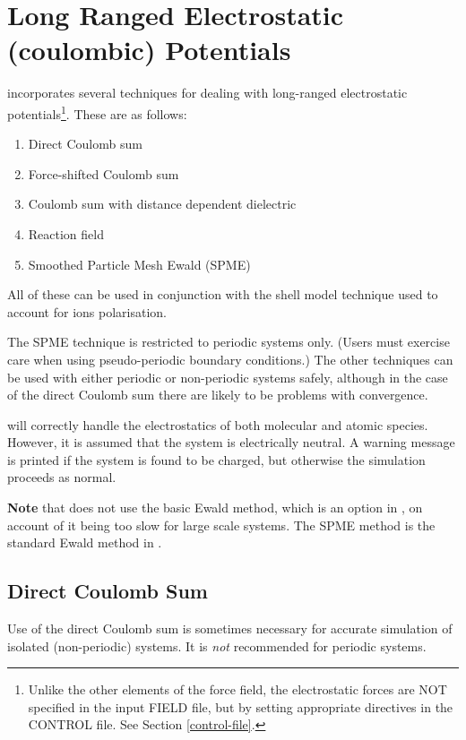 \section{Long Ranged Electrostatic (coulombic) Potentials}
\label{coulomb}

\D incorporates several techniques for dealing with long-ranged
electrostatic potentials\footnote{Unlike the
other elements of the force field, the electrostatic forces are
NOT specified in the input FIELD file, but by setting appropriate
directives in the CONTROL file. See Section \ref{control-file}.}.
These are as follows:
\begin{enumerate}
\item Direct Coulomb sum
\item Force-shifted Coulomb sum
\item Coulomb sum with distance dependent dielectric
\item Reaction field
\item Smoothed Particle Mesh Ewald (SPME)
\end{enumerate}
All of these can be used in conjunction with the shell
model technique used to
account for ions polarisation.

The SPME technique is restricted to periodic systems only. (Users
must exercise care when using pseudo-periodic boundary
conditions.)  The other techniques can
be used with either periodic or non-periodic systems safely,
although in the case of the direct Coulomb sum there are likely to be problems with convergence.

\D will correctly handle the electrostatics of both molecular and
atomic species.  However, it is assumed that the system is
electrically neutral.  A warning message is printed if the system
is found to be charged, but otherwise the simulation proceeds as
normal.

{\bf Note} that \D does not use the basic Ewald method, which is an
option in \C, on account of it being too slow for large
scale systems.  The SPME method is the standard Ewald method in \D.

\subsection{Direct Coulomb Sum}

Use of the direct Coulomb sum is
sometimes necessary for accurate simulation of isolated
(non-periodic) systems.  It is {\em not} recommended for periodic
systems.


